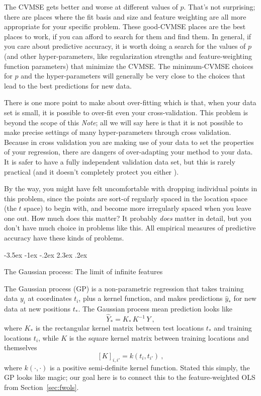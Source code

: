 \documentclass[12pt,letterpaper]{article}
\makeatletter
\renewcommand\section{\@startsection {section}{1}{\z@}%
  {-3.5ex \@plus -1ex \@minus -.2ex}%
  {2.3ex \@plus.2ex}%
  {\raggedright\normalfont\Large\bfseries}}
\newcommand{\documentname}{\textsl{Note}}
\newcommand{\sectionname}{Section}
\makeatother
\begin{document}
The CVMSE gets better and worse at different values of $p$.
That's not surprising; there are places where the fit basis and size and feature weighting are all more appropriate for your specific problem.
These good-CVMSE places are the best places to work, if you can afford to search for them and find them.
In general, if you care about predictive accuracy, it is worth doing a search for the values of $p$ (and other hyper-parameters, like regularization strengths and feature-weighting function parameters) that minimize the CVMSE.
The minimum-CVMSE choices for $p$ and the hyper-parameters will generally be very close to the choices that lead to the best predictions for new data.

There is one more point to make about over-fitting which is that, when your data set is small, it is possible to over-fit even your cross-validation.
This problem is beyond the scope of this \documentname; all we will say here is that it is not possible to make precise settings of many hyper-parameters through cross validation.
Because in cross validation you are making use of your data to set the properties of your regression, there are dangers of over-adapting your method to your data.
It is safer to have a fully independent validation data set, but this is rarely practical (and it doesn't completely protect you either \citealt{cifar10}).

By the way, you might have felt uncomfortable with dropping individual points in this problem, since the points are sort-of regularly spaced in the location space (the $t$ space) to begin with, and become more irregularly spaced when you leave one out.
How much does this matter?
It probably \emph{does} matter in detail, but you don't have much choice in problems like this.
All empirical measures of predictive accuracy have these kinds of problems.

\section{The Gaussian process: The limit of infinite features}\label{sec:gp}

The Gaussian process (GP) is a non-parametric regression that takes training data $y_i$ at coordinates $t_i$, plus a kernel function, and makes predictions $\hat{y}_\ast$ for new data at new positions $t_\ast$.
The Gaussian process mean prediction looks like%
\begin{equation}\label{eq:gpmean}
    \hat{Y}_\ast = K_\ast\,K^{-1}\,Y
    ~,
\end{equation}
where $K_\ast$ is the rectangular kernel matrix between test locations $t_\ast$ and training locations $t_i$, while $K$ is the square kernel matrix between training locations and themselves
\begin{equation}\label{eq:Kmatrix}
    [K]_{i,i'} = k(t_i,t_{i'})
    ~,
\end{equation}
where $k(\cdot,\cdot)$ is a positive semi-definite kernel function.
Stated this simply, the GP looks like magic; our goal here is to connect this to the feature-weighted OLS from \sectionname~\ref{sec:fwols}.
\end{document}
